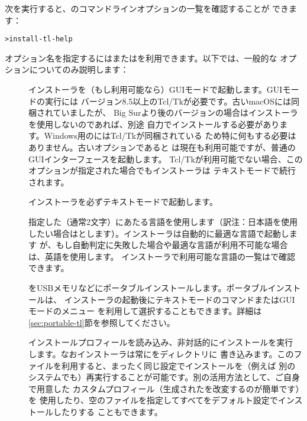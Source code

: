 \documentclass[uplatex,dvipdfmx]{jsarticle}
\begin{document}
次を実行すると、のコマンドラインオプションの一覧を確認することが
できます：
%
\begin{alltt}
> install-tl -help
\end{alltt}
%
オプション名を指定するには\sopt{}または\lopt{}を利用できます。以下では、一般的な
オプションについてのみ説明します：
%
\begin{description}
\item[]
インストーラを（もし利用可能なら）GUIモードで起動します。GUIモードの実行には
バージョン8.5以上のTcl/Tkが必要です。古いmacOSには同梱されていましたが、
Big Surより後のバージョンの場合は\MacTeX インストーラを使用しないのであれば、別途
自力でインストールする必要があります。Windows用の\TL にはTcl/Tkが同梱されている
ため特に何もする必要はありません。古いオプションであると
は現在も利用可能ですが、普通のGUIインターフェースを起動します。
Tcl/Tkが利用可能でない場合、このオプションが指定された場合でもインストーラは
テキストモードで続行されます。

\item[]
インストーラを必ずテキストモードで起動します。

\item[]
指定した（通常2文字）にあたる言語を使用します（訳注：日本語を使用
したい場合はとします）。インストーラは自動的に最適な言語で起動します
が、もし自動判定に失敗した場合や最適な言語が利用不可能な場合は、英語を使用します。
インストーラで利用可能な言語の一覧はで確認できます。

\item[]
\TL をUSBメモリなどにポータブルインストールします。ポータブルインストールは、
インストーラの起動後にテキストモードのコマンドまたはGUIモードのメニュー
を利用して選択することもできます。詳細は\ref{sec:portable-tl}節を参照してください。

\item[]
インストールプロフィールを読み込み、非対話的にインストールを実行
します。なおインストーラは常にをディレクトリに
書き込みます。このファイルを利用すると、まったく同じ設定でインストールを（例えば
別のシステムでも）再実行することが可能です。別の活用方法として、ご自身で用意した
カスタムプロフィール（生成されたを改変するのが簡単です）を
使用したり、空のファイルを指定してすべてをデフォルト設定でインストールしたりする
こともできます。


\end{description}
\end{document}
